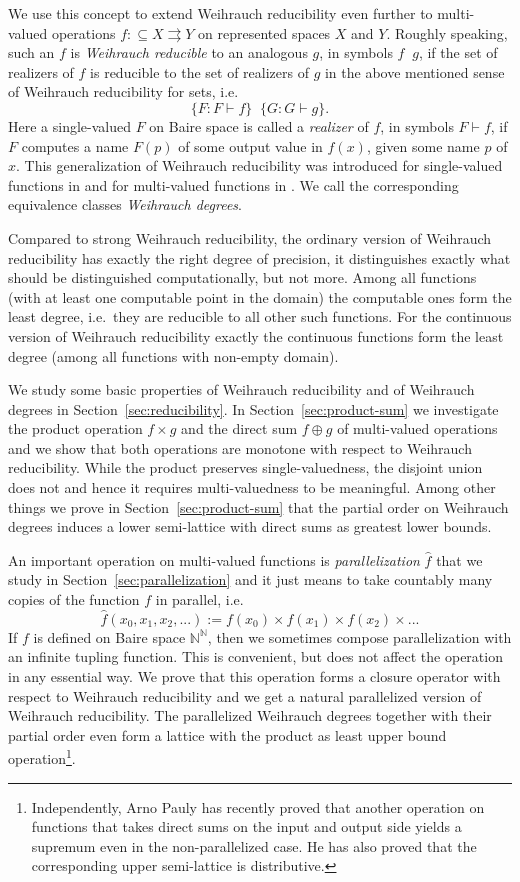 \documentclass[jsl,10pt]{noasl}
\def\IN{{\mathbb{N}}}
\def\In{\subseteq}
\def\mto{\rightrightarrows}
\def\leqW{\mathop{\leq_{\mathrm{W}}}}
\begin{document}
We use this concept to extend Weihrauch reducibility even further to 
multi-valued operations $f:\In X\mto Y$ on represented spaces $X$ and $Y$.
Roughly speaking, such an $f$ is {\em Weihrauch reducible} to an analogous $g$,
in symbols $f\leqW g$, if the set of realizers of $f$ is reducible to the set of 
realizers of $g$ in the above mentioned sense of Weihrauch reducibility for sets, i.e.\
\[\{F:F\vdash f\}\leqW\{G:G\vdash g\}.\]
Here a single-valued $F$ on Baire space is called a {\em realizer} of $f$, in symbols $F\vdash f$,
if $F$ computes a name $F(p)$ of some output value in $f(x)$, given some name $p$ of $x$.
This generalization of Weihrauch reducibility was introduced for single-valued functions in \cite{Bra05}
and for multi-valued functions in \cite{GM09}. We call the corresponding equivalence classes
{\em Weihrauch degrees}. 

Compared to strong Weihrauch reducibility, the ordinary version of Weih\-rauch
reducibility has exactly the right degree of precision, it distinguishes exactly
what should be distinguished computationally, but not more.
Among all functions (with at least one computable point in the domain)
the computable ones form the least degree, i.e.\ they are reducible to all other such functions.
For the continuous version of Weihrauch reducibility exactly the continuous
functions form the least degree (among all functions with non-empty domain).

We study some basic properties of Weihrauch reducibility and of Weihrauch degrees in Section~\ref{sec:reducibility}.
In Section~\ref{sec:product-sum} we investigate the product operation $f\times g$
and the direct sum $f\oplus g$ of multi-valued operations and we show that both
operations are monotone with respect to Weihrauch reducibility.
While the product preserves single-valuedness, the disjoint union does not and
hence it requires multi-valuedness to be meaningful.
Among other things we prove in Section~\ref{sec:product-sum} that the partial
order on Weihrauch degrees induces a lower semi-lattice with direct sums as
greatest lower bounds.

An important operation on multi-valued functions is {\em parallelization} $\widehat{f}$ that we study in 
Section~\ref{sec:parallelization}
and it just means to take countably many copies of the function $f$ in parallel, i.e.\
\[\widehat{f}(x_0,x_1,x_2,...):=f(x_0)\times f(x_1)\times f(x_2)\times...\]
If $f$ is defined on Baire space $\IN^\IN$, then we sometimes compose parallelization
with an infinite tupling function. This is convenient, but does not affect the operation in any essential way.
We prove that this operation forms a closure operator with respect to Weihrauch
reducibility and we get a natural parallelized version of Weihrauch
reducibility.
The parallelized Weihrauch degrees together with their partial order even
form a lattice with the product as least upper bound operation\footnote{Independently, 
Arno Pauly \cite{Pau09} has recently proved 
that another operation on functions that takes direct sums on the input and
output side yields a supremum even in the non-parallelized case. He has also proved
that the corresponding upper semi-lattice is distributive.}.
\end{document}
